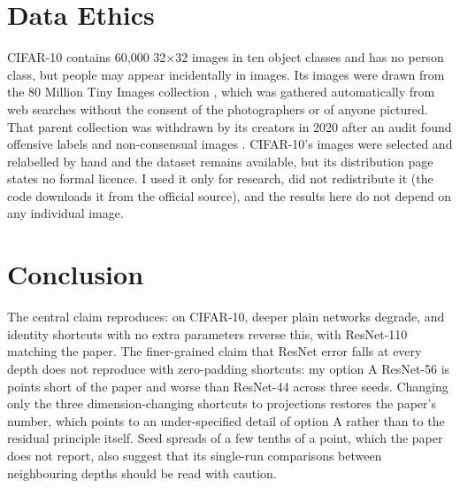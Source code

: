 \documentclass[conference]{IEEEtran}
\begin{document}
\section{Data Ethics}
\label{sec:ethics}
CIFAR-10 \cite{krizhevsky2009learning} contains 60,000 32$\times$32 images in ten object classes and has no person class, but people may appear incidentally in images. Its images were drawn from the 80 Million Tiny Images collection \cite{torralba2008tiny}, which was gathered automatically from web searches without the consent of the photographers or of anyone pictured. That parent collection was withdrawn by its creators in 2020 after an audit found offensive labels and non-consensual images \cite{prabhu2021large}. CIFAR-10's images were selected and relabelled by hand and the dataset remains available, but its distribution page states no formal licence. I used it only for research, did not redistribute it (the code downloads it from the official source), and the results here do not depend on any individual image.

\section{Conclusion}
The central claim reproduces: on CIFAR-10, deeper plain networks degrade, and identity shortcuts with no extra parameters reverse this, with ResNet-110 matching the paper. The finer-grained claim that ResNet error falls at every depth does not reproduce with zero-padding shortcuts: my option A ResNet-56 is  points short of the paper and worse than ResNet-44 across three seeds. Changing only the three dimension-changing shortcuts to projections restores the paper's number, which points to an under-specified detail of option A rather than to the residual principle itself. Seed spreads of a few tenths of a point, which the paper does not report, also suggest that its single-run comparisons between neighbouring depths should be read with caution.



\end{document}
